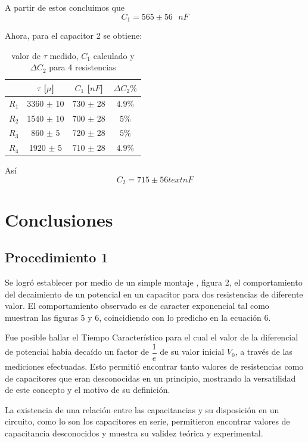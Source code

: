 \documentclass[10pt,letter]{article}
\begin{document}
\begin{multicols}{2}
A partir de estos concluimos que 
$$C_1=565\pm56 \text{ }nF$$

Ahora, para el capacitor 2 se obtiene:
\begin{table}[H]
\centering
\begin{tabular}{|c|c|c|c|}
\hline
 & $\tau$ [$\mu$] & $C_1$ [$nF$] & $\Delta C_2\%$ \\ \hline
$R_1$ & 3360 $\pm$ 10 & 730 $\pm$ 28 & $4.9\%$ \\ \hline
$R_2$ & 1540 $\pm$ 10 & 700 $\pm$ 28 & $5\%$ \\ \hline
$R_3$ & 860 $\pm$ 5 & 720 $\pm$ 28 & $5\%$ \\ \hline
$R_4$ & 1920 $\pm$ 5 & 710 $\pm$ 28 & $4.9\%$ \\ \hline
\end{tabular}
\caption{valor de $\tau$ medido, $C_1$ calculado y $\Delta C_2$ para 4 resistencias }
\end{table}

Así
$$C_2=715\pm56 text{ }nF$$

\section{Conclusiones}
\subsection{Procedimiento 1}
Se logró establecer por medio de un simple montaje , figura 2, el comportamiento del decaimiento de un potencial en un capacitor para dos resistencias de diferente valor. El comportamiento observado es de caracter exponencial tal como muestran las figuras 5 y 6, coincidiendo con lo predicho en la ecuación 6.

\vspace{0.2cm}

Fue posible hallar el Tiempo Característico  para el cual el valor de la diferencial de potencial había decaído un factor de $\dfrac{1}{e}$ de su valor inicial $V_0$, a través de las mediciones efectuadas. Esto permitió encontrar tanto valores de resistencias como de capacitores que eran desconocidas en un principio, mostrando la versatilidad de este concepto y el motivo de su definición.

\vspace{0.2cm}
La existencia de una relación entre las capacitancias y su disposición en un circuito, como lo son los capacitores en serie, permitieron encontrar valores de capacitancia desconocidos y muestra su validez teórica y experimental. 

\end{multicols}
\end{document}
